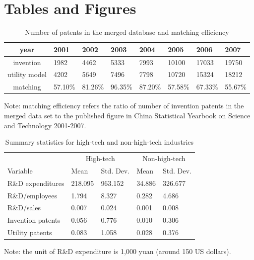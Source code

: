 \documentclass[english]{article}
\begin{document}
\section*{Tables and Figures}

\begin{center}
\begin{table}[H]
\label{T1}
\caption{Number of patents in the merged database and matching efficiency}

\begin{centering}
\begin{tabular}{clllllll}
\hline\hline
year & 2001 & 2002 & 2003 & 2004 & 2005 & 2006 & 2007\\
\hline\hline
invention & 1982 & 4462 & 5333 & 7993 & 10100 & 17033 & 19750 \\
utility model & 4202 & 5649 & 7496 & 7798 & 10720 & 15324 & 18212\\
\hline
matching  & 57.10\% & 81.26\% & 96.35\% & 87.20\% & 57.58\% & 67.33\% & 55.67\% \\
\hline
\hline
\end{tabular}
\par\end{centering}
{\small{}Note: matching efficiency refers the ratio of number of invention
patents in the merged data set to the published figure in China Statistical
Yearbook on Science and Technology 2001-2007.}{\small \par}
\end{table}
\par\end{center}


\begin{center}
\begin{table}[H]
\caption{Summary statistics for high-tech and non-high-tech industries}
\label{T2}
\begin{centering}
\begin{tabular}{lllll}
\hline\hline
 & \multicolumn{2}{c}{High-tech} & \multicolumn{2}{c}{Non-high-tech} \\
Variable & Mean & Std. Dev. & Mean & Std. Dev.\\
\hline\hline 
R\&D expenditures & 218.095 & 963.152 & 34.886 & 326.677\\
R\&D/employees & 1.794 & 8.327 & 0.282 & 4.686\\
R\&D/sales & 0.007 & 0.024 & 0.001 & 0.008\\
Invention patents & 0.056 & 0.776 & 0.010 & 0.306\\
Utility patents & 0.083 & 1.058 & 0.028 & 0.376\\
\hline\hline
\end{tabular}
\par\end{centering}
{\small{}Note: the unit of R\&D expenditure is 1,000 yuan (around
150 US dollars).}{\small \par}
\end{table}
\par\end{center}
\end{document}
